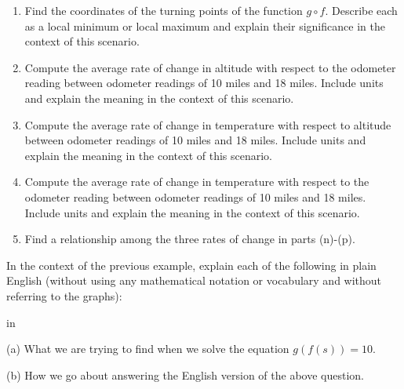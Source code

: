 \documentclass{ximera}
\newcommand{\pskip}{\vskip 0.1 in}
\begin{document}
\begin{example}
\begin{enumerate}
\item Find the coordinates of the turning points of the function $g\circ f$. Describe each as a local minimum or local maximum and explain their significance in the context of this scenario.

\item Compute the average rate of change in altitude with respect to the odometer reading between odometer readings of 10 miles and 18 miles. Include units and explain the meaning in the context of this scenario.

\item Compute the average rate of change in temperature with respect to altitude between odometer readings of 10 miles and 18 miles. Include units and explain the meaning in the context of this scenario.

\item Compute the average rate of change in temperature with respect to the odometer reading between odometer readings of 10 miles and 18 miles. Include units and explain the meaning in the context of this scenario.

\item Find a relationship among the three rates of change in parts (n)-(p).

\end{enumerate}


\begin{exploration}\label{Exp3:Comp}

 
\begin{onlineOnly}
    \begin{center}
\end{center}
\end{onlineOnly}
\end{exploration}

\end{example}



\begin{example} \label{Ex4:Comp}
In the context of the previous example, explain each of the following in plain English (without using any mathematical notation or vocabulary and without referring to the graphs):

\pskip

(a) What we are trying to find when we solve the equation $g(f(s)) = 10$.

(b) How we go about answering the English version of the above question.

\end{example}
\end{document}
